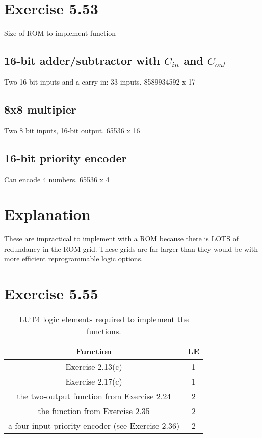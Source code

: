 \documentclass{article}
\begin{document}
\section*{Exercise 5.53}

Size of ROM to implement function

\subsection*{16-bit adder/subtractor with $C_{in}$ and $C_{out}$}
Two 16-bit inputs and a carry-in: 33 inputs.
8589934592 x 17

\subsection*{8x8 multipier}
Two 8 bit inputs, 16-bit output.
65536 x 16

\subsection*{16-bit priority encoder}
Can encode 4 numbers.
65536 x 4

\section*{Explanation}
These are impractical to implement with a ROM because there
is LOTS of redundancy in the ROM grid. These grids are far
larger than they would be with more efficient reprogrammable
logic options.


\pagebreak
\section*{Exercise 5.55}

\begin{table}[H]
    \renewcommand{\arraystretch}{1.2}
    \caption{LUT4 logic elements required to implement the functions.}
    \begin{center}
        \begin{tabular}{|c|c|}
            \hline
            Function & LE\\\hline
            \hline
            Exercise 2.13(c) & 1\\\hline
            Exercise 2.17(c) & 1\\\hline
            the two-output function from Exercise 2.24 & 2\\\hline
            the function from Exercise 2.35 & 2\\\hline
            a four-input priority encoder (see Exercise 2.36) & 2\\\hline
        \end{tabular}
    \end{center}
    \label{tab:decode}
\end{table}
\end{document}

